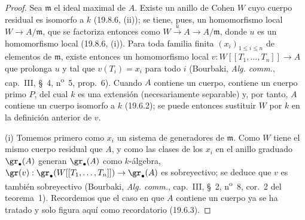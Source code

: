 \begin{proof}
Sea $\mathfrak m$ el ideal maximal de $A$. Existe un anillo de Cohen $W$ cuyo
cuerpo residual es isomorfo a $k$ (19.8.6, (ii)); se tiene, pues, un
homomorfismo local $W\to A/\mathfrak m$, que se factoriza entonces como
$W\xrightarrow{u}A\to A/\mathfrak m$, donde $u$ es un homomorfismo local
(19.8.6, (i)). Para toda familia finita $(x_i)_{1\leq i\leq n}$ de elementos
de $\mathfrak m$, existe entonces un homomorfismo local
$v:W[[T_1,\ldots,T_n]]\to A$ que prolonga $u$ y tal que $v(T_i)=x_i$ para todo
$i$ (Bourbaki, \emph{Alg. comm.}, cap.~III, §~4, n\textsuperscript{o}~5,
prop.~6). Cuando $A$ contiene un cuerpo, contiene un cuerpo primo $P$, del cual
$k$ es una extensión (necesariamente separable) y, por tanto, $A$ contiene un
cuerpo isomorfo a $k$ (19.6.2); se puede entonces sustituir $W$ por $k$ en la
definición anterior de $v$.

\medskip
\noindent(i)\enspace
Tomemos primero como $x_i$ un sistema de generadores de $\mathfrak m$. Como
$W$ tiene el mismo cuerpo residual que $A$, y como las clases de los $x_i$ en
el anillo graduado $\gr_\bullet(A)$ generan $\gr_\bullet(A)$ como $k$-álgebra,
$\gr(v):\gr_\bullet(W[[T_1,\ldots,T_n]])\to\gr_\bullet(A)$ es sobreyectivo;
se deduce que $v$ es también sobreyectivo (Bourbaki, \emph{Alg. comm.},
cap.~III, §~2, n\textsuperscript{o}~8, cor.~2 del teorema~1). Recordemos que el
caso en que $A$ contiene un cuerpo ya se ha tratado y solo figura aquí como
recordatorio (19.6.3).


\end{proof}
